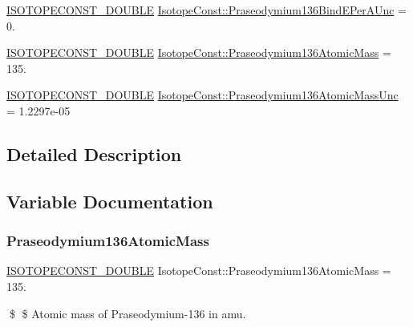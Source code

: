 \begin{DoxyCompactItemize}
\item 
\mbox{\hyperlink{group___isotope_const-_macros_ga8f45a7272ce02c0b4c65c44636ed719a}{I\+S\+O\+T\+O\+P\+E\+C\+O\+N\+S\+T\+\_\+\+D\+O\+U\+B\+LE}} \mbox{\hyperlink{group___isotope_const-_praseodymium-_pr136_ga3fa0cb78da3289d6320f0f6908a26fbe}{Isotope\+Const\+::\+Praseodymium136\+Bind\+E\+Per\+A\+Unc}} = 0.
\item 
\mbox{\hyperlink{group___isotope_const-_macros_ga8f45a7272ce02c0b4c65c44636ed719a}{I\+S\+O\+T\+O\+P\+E\+C\+O\+N\+S\+T\+\_\+\+D\+O\+U\+B\+LE}} \mbox{\hyperlink{group___isotope_const-_praseodymium-_pr136_gaaab483879d57c12b71c0ee8b70e03f08}{Isotope\+Const\+::\+Praseodymium136\+Atomic\+Mass}} = 135.
\item 
\mbox{\hyperlink{group___isotope_const-_macros_ga8f45a7272ce02c0b4c65c44636ed719a}{I\+S\+O\+T\+O\+P\+E\+C\+O\+N\+S\+T\+\_\+\+D\+O\+U\+B\+LE}} \mbox{\hyperlink{group___isotope_const-_praseodymium-_pr136_ga08c97f0d6d570cfa34d10b4aff37435d}{Isotope\+Const\+::\+Praseodymium136\+Atomic\+Mass\+Unc}} = 1.\+2297e-\/05
\end{DoxyCompactItemize}


\subsection{Detailed Description}


\subsection{Variable Documentation}
\mbox{\label{group___isotope_const-_praseodymium-_pr136_gaaab483879d57c12b71c0ee8b70e03f08}} 
\subsubsection{\texorpdfstring{Praseodymium136\+Atomic\+Mass}{Praseodymium136AtomicMass}}
{\footnotesize\ttfamily \mbox{\hyperlink{group___isotope_const-_macros_ga8f45a7272ce02c0b4c65c44636ed719a}{I\+S\+O\+T\+O\+P\+E\+C\+O\+N\+S\+T\+\_\+\+D\+O\+U\+B\+LE}} Isotope\+Const\+::\+Praseodymium136\+Atomic\+Mass = 135.}

\$ \$ Atomic mass of Praseodymium-\/136 in amu. \mbox{\label{group___isotope_const-_praseodymium-_pr136_ga08c97f0d6d570cfa34d10b4aff37435d}} 
